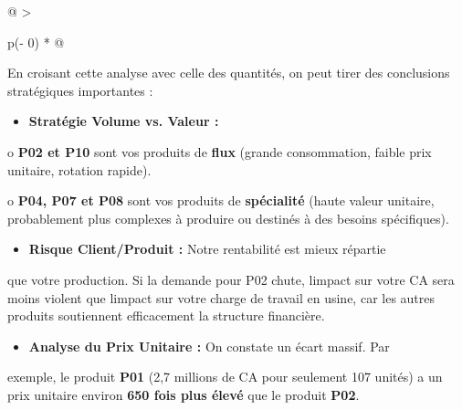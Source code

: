 \documentclass[
]{article}
\begin{document}
\begin{longtable}[]{@{}
  >{\raggedright\arraybackslash}p{(\columnwidth - 0\tabcolsep) * }@{}}
\begin{minipage}[b]{\linewidth}

En croisant cette analyse avec celle des quantités, on peut tirer des
conclusions stratégiques importantes :

\begin{itemize}
\item \textbf{Stratégie Volume vs. Valeur :}

\end{itemize}
o \textbf{P02 et P10} sont vos produits de \textbf{flux} (grande
consommation, faible prix unitaire, rotation rapide).

o \textbf{P04, P07 et P08} sont vos produits de \textbf{spécialité}
(haute valeur unitaire, probablement plus complexes à produire ou
destinés à des besoins spécifiques).

\begin{itemize}
\item \textbf{Risque Client/Produit :} Notre rentabilité est mieux répartie
\end{itemize}
que votre production. Si la demande pour P02 chute,
l\textquotesingle impact sur votre CA sera moins violent que
l\textquotesingle impact sur votre charge de travail en usine, car les
autres produits soutiennent efficacement la structure financière.

\begin{itemize}
\item \textbf{Analyse du Prix Unitaire :} On constate un écart massif. Par
\end{itemize}
exemple, le produit \textbf{P01} (2,7 millions de CA pour seulement 107
unités) a un prix unitaire environ \textbf{650 fois plus élevé} que le
produit \textbf{P02}.
\end{minipage} \\
\midrule\noalign{}
\endhead
\bottomrule\noalign{}
\endlastfoot
\end{longtable}

\begin{center}
\end{center}

\begin{center}
\end{center}
\end{document}
